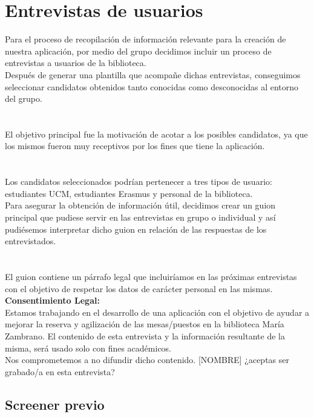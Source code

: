 \documentclass[12pt]{article}
\begin{document}
\section{Entrevistas de usuarios}
Para el proceso de recopilación de información relevante para la creación de nuestra aplicación, por medio del grupo decidimos incluir un proceso de entrevistas a usuarios de la biblioteca.\\ Después de generar una plantilla que acompañe dichas entrevistas, conseguimos seleccionar candidatos obtenidos tanto conocidas como desconocidas al entorno del grupo.\\
\\
\\
El objetivo principal fue la motivación de acotar a los posibles candidatos, ya que los mismos fueron muy receptivos por los fines que tiene la aplicación.\\ 
\\
\\
Los candidatos seleccionados podrían pertenecer a tres tipos de usuario: estudiantes UCM, estudiantes Erasmus y personal de la biblioteca.\\ Para asegurar la obtención de información útil, decidimos crear un guion principal que pudiese servir en las entrevistas en grupo o individual y así pudiésemos interpretar dicho guion en relación de las respuestas de los entrevistados.\\
\\
\\
El guion contiene un párrafo legal que incluiríamos en las próximas entrevistas con el objetivo de respetar los datos de carácter personal en las mismas.\\
\newpage
\textbf{Consentimiento Legal:}
\\
         Estamos trabajando en el desarrollo de una aplicación con el objetivo de ayudar a mejorar la reserva y agilización de las mesas/puestos en la biblioteca María Zambrano.
             El contenido de esta entrevista y la información resultante de la misma, será usado solo con fines académicos.\\
             Nos comprometemos a no difundir dicho contenido. 
[NOMBRE] ¿aceptas ser grabado/a en esta entrevista?

\subsection{Screener previo}
\end{document}
